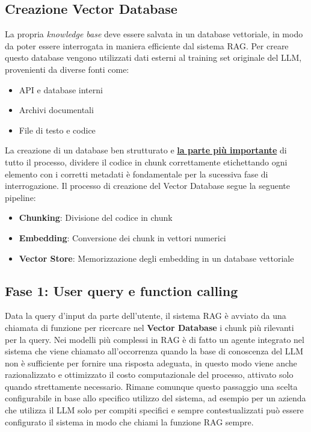 \documentclass[12pt,a4paper,openright,twoside]{book}
\begin{document}

\subsection{Creazione Vector Database}
La propria \emph{knowledge base} deve essere salvata in un database vettoriale, in modo da poter essere interrogata in maniera efficiente dal sistema RAG.
Per creare questo database vengono utilizzati dati esterni al training set originale del LLM, provenienti da diverse fonti come:
\begin{itemize}
    \item API e database interni
    \item Archivi documentali
    \item File di testo e codice
\end{itemize}
La creazione di un database ben strutturato e \textbf{\underline{la parte più importante}} di tutto il processo, dividere il codice in chunk correttamente etichettando ogni elemento con i corretti metadati è fondamentale per la sucessiva fase di interrogazione.
Il processo di creazione del Vector Database segue la seguente pipeline:
\begin{itemize}
    \item \textbf{Chunking}: Divisione del codice in chunk 
    \item \textbf{Embedding}: Conversione dei chunk in vettori numerici
    \item \textbf{Vector Store}: Memorizzazione degli embedding in un database vettoriale
\end{itemize}


\subsection{Fase 1: User query e function calling}
Data la query d'input da parte dell'utente, il sistema RAG è avviato da una chiamata di funzione per ricercare nel
\textbf{Vector Database} i chunk più rilevanti per la query.
Nei modelli più complessi in RAG è di fatto un agente integrato nel sistema che viene chiamato all'occorrenza quando la base di conoscenza del LLM non è sufficiente per fornire una risposta adeguata,
in questo modo viene anche razionalizzato e ottimizzato il costo computazionale del processo,
attivato solo quando strettamente necessario.
Rimane comunque questo passaggio una scelta configurabile in base allo specifico utilizzo del sistema,
ad esempio per un azienda che utilizza il LLM solo per compiti specifici e sempre contestualizzati può essere configurato il sistema in modo che chiami
la funzione RAG sempre.
\end{document}
